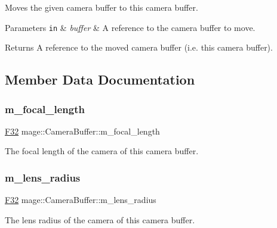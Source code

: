Moves the given camera buffer to this camera buffer.


\begin{DoxyParams}[1]{Parameters}
\mbox{\tt in}  & {\em buffer} & A reference to the camera buffer to move. \\
\hline
\end{DoxyParams}
\begin{DoxyReturn}{Returns}
A reference to the moved camera buffer (i.\+e. this camera buffer). 
\end{DoxyReturn}


\subsection{Member Data Documentation}
\hypertarget{structmage_1_1_camera_buffer_a5ecb7ec90a7bc1900846d53488315d33}{}\label{structmage_1_1_camera_buffer_a5ecb7ec90a7bc1900846d53488315d33} 
\subsubsection{\texorpdfstring{m\+\_\+focal\+\_\+length}{m\_focal\_length}}
{\footnotesize\ttfamily \hyperlink{namespacemage_aa97e833b45f06d60a0a9c4fc22ae02c0}{F32} mage\+::\+Camera\+Buffer\+::m\+\_\+focal\+\_\+length}

The focal length of the camera of this camera buffer. \hypertarget{structmage_1_1_camera_buffer_ac3b147c3f8971a8b06bfcb3bd971179c}{}\label{structmage_1_1_camera_buffer_ac3b147c3f8971a8b06bfcb3bd971179c} 
\subsubsection{\texorpdfstring{m\+\_\+lens\+\_\+radius}{m\_lens\_radius}}
{\footnotesize\ttfamily \hyperlink{namespacemage_aa97e833b45f06d60a0a9c4fc22ae02c0}{F32} mage\+::\+Camera\+Buffer\+::m\+\_\+lens\+\_\+radius}

The lens radius of the camera of this camera buffer. \hypertarget{structmage_1_1_camera_buffer_a324324132e7cd8d0d0259a47d0305430}{}\label{structmage_1_1_camera_buffer_a324324132e7cd8d0d0259a47d0305430} 
